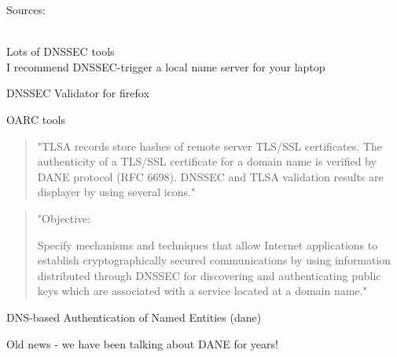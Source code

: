 \documentclass[Screen16to9,17pt]{foils}
\begin{document}
Sources:\\
{\tiny
{}\\
}




Lots of DNSSEC tools\\
I recommend DNSSEC-trigger a local name server for your laptop

\begin{list2}
\item DNSSEC Validator for firefox\\ 
\item OARC tools 
\item {}
\end{list2}



\begin{quote}
"TLSA records store hashes of remote server TLS/SSL certificates. The authenticity of a TLS/SSL certificate for a domain name is verified by DANE protocol (RFC 6698). DNSSEC and TLSA validation results are displayer by using several icons."
\end{quote}



\begin{quote}
"Objective:

Specify mechanisms and techniques that allow Internet applications to
establish cryptographically secured communications by using information
distributed through DNSSEC for discovering and authenticating public
keys which are associated with a service located at a domain name."
\end{quote}

DNS-based Authentication of Named Entities (dane)

Old news - we have been talking about DANE for years!
\\
{\footnotesize {}}
\end{document}
